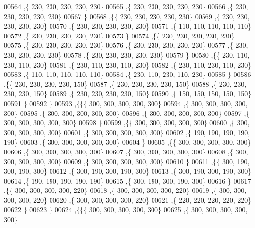 \begin{DoxyCode}
00564    ,\{   230,   230,   230,   230,   230\}
00565    ,\{   230,   230,   230,   230,   230\}
00566    ,\{   230,   230,   230,   230,   230\}
00567    \}
00568   ,\{\{   230,   230,   230,   230,   230\}
00569    ,\{   230,   230,   230,   230,   230\}
00570    ,\{   230,   230,   230,   230,   230\}
00571    ,\{   110,   110,   110,   110,   110\}
00572    ,\{   230,   230,   230,   230,   230\}
00573    \}
00574   ,\{\{   230,   230,   230,   230,   230\}
00575    ,\{   230,   230,   230,   230,   230\}
00576    ,\{   230,   230,   230,   230,   230\}
00577    ,\{   230,   230,   230,   230,   230\}
00578    ,\{   230,   230,   230,   230,   230\}
00579    \}
00580   ,\{\{   230,   110,   230,   110,   230\}
00581    ,\{   230,   110,   230,   110,   230\}
00582    ,\{   230,   110,   230,   110,   230\}
00583    ,\{   110,   110,   110,   110,   110\}
00584    ,\{   230,   110,   230,   110,   230\}
00585    \}
00586   ,\{\{   230,   230,   230,   230,   150\}
00587    ,\{   230,   230,   230,   230,   150\}
00588    ,\{   230,   230,   230,   230,   150\}
00589    ,\{   230,   230,   230,   230,   150\}
00590    ,\{   150,   150,   150,   150,   150\}
00591    \}
00592   \}
00593  ,\{\{\{   300,   300,   300,   300,   300\}
00594    ,\{   300,   300,   300,   300,   300\}
00595    ,\{   300,   300,   300,   300,   300\}
00596    ,\{   300,   300,   300,   300,   300\}
00597    ,\{   300,   300,   300,   300,   300\}
00598    \}
00599   ,\{\{   300,   300,   300,   300,   300\}
00600    ,\{   300,   300,   300,   300,   300\}
00601    ,\{   300,   300,   300,   300,   300\}
00602    ,\{   190,   190,   190,   190,   190\}
00603    ,\{   300,   300,   300,   300,   300\}
00604    \}
00605   ,\{\{   300,   300,   300,   300,   300\}
00606    ,\{   300,   300,   300,   300,   300\}
00607    ,\{   300,   300,   300,   300,   300\}
00608    ,\{   300,   300,   300,   300,   300\}
00609    ,\{   300,   300,   300,   300,   300\}
00610    \}
00611   ,\{\{   300,   190,   300,   190,   300\}
00612    ,\{   300,   190,   300,   190,   300\}
00613    ,\{   300,   190,   300,   190,   300\}
00614    ,\{   190,   190,   190,   190,   190\}
00615    ,\{   300,   190,   300,   190,   300\}
00616    \}
00617   ,\{\{   300,   300,   300,   300,   220\}
00618    ,\{   300,   300,   300,   300,   220\}
00619    ,\{   300,   300,   300,   300,   220\}
00620    ,\{   300,   300,   300,   300,   220\}
00621    ,\{   220,   220,   220,   220,   220\}
00622    \}
00623   \}
00624  ,\{\{\{   300,   300,   300,   300,   300\}
00625    ,\{   300,   300,   300,   300,   300\}

\end{DoxyCode}

